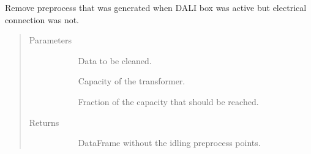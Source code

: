 \documentclass[letterpaper,10pt,english]{sphinxmanual}
\begin{document}
\begin{fulllineitems}
\label{\detokenize{autoapi/src/preprocess/preprocess/index:src.preprocess.preprocess.remove_leading_idling}}
Remove preprocess that was generated when DALI box was active but electrical connection was not.
\begin{quote}\begin{description}
\item[{Parameters}] \leavevmode\begin{description}
\item[{}] \leavevmode{[}\sphinxcode{\sphinxupquote{ps.DataFrame}}{]}
Data to be cleaned.

\item[{}] \leavevmode
Capacity of the transformer.

\item[{}] \leavevmode
Fraction of the capacity that should be reached.

\end{description}

\item[{Returns}] \leavevmode\begin{description}
\item[{}] \leavevmode
DataFrame without the idling preprocess points.

\end{description}

\end{description}\end{quote}

\end{fulllineitems}

\end{document}
